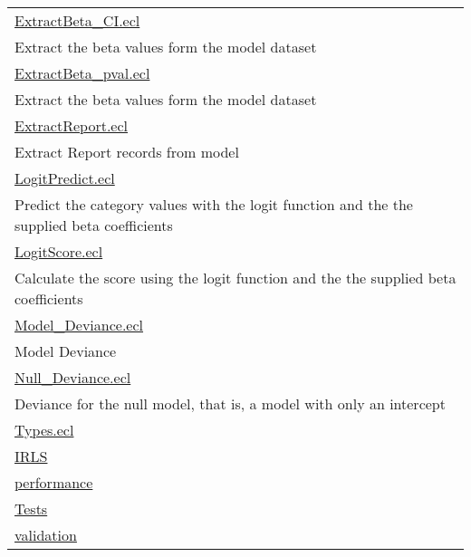 {\begin{longtable}{|p{\textwidth}|}
\hline
\hyperlink{ecldoc:toc:LogisticRegression.ExtractBeta_CI}{ExtractBeta\_CI.ecl} \\
Extract the beta values form the model dataset \\
\hline
\hyperlink{ecldoc:toc:LogisticRegression.ExtractBeta_pval}{ExtractBeta\_pval.ecl} \\
Extract the beta values form the model dataset \\
\hline
\hyperlink{ecldoc:toc:LogisticRegression.ExtractReport}{ExtractReport.ecl} \\
Extract Report records from model \\
\hline
\hyperlink{ecldoc:toc:LogisticRegression.LogitPredict}{LogitPredict.ecl} \\
Predict the category values with the logit function and the the supplied beta coefficients \\
\hline
\hyperlink{ecldoc:toc:LogisticRegression.LogitScore}{LogitScore.ecl} \\
Calculate the score using the logit function and the the supplied beta coefficients \\
\hline
\hyperlink{ecldoc:toc:LogisticRegression.Model_Deviance}{Model\_Deviance.ecl} \\
Model Deviance \\
\hline
\hyperlink{ecldoc:toc:LogisticRegression.Null_Deviance}{Null\_Deviance.ecl} \\
Deviance for the null model, that is, a model with only an intercept \\
\hline
\hyperlink{ecldoc:toc:LogisticRegression.Types}{Types.ecl} \\
\hline
\hyperlink{ecldoc:toc:root/LogisticRegression/IRLS}{IRLS} \\
\hline
\hyperlink{ecldoc:toc:root/LogisticRegression/performance}{performance} \\
\hline
\hyperlink{ecldoc:toc:root/LogisticRegression/Tests}{Tests} \\
\hline
\hyperlink{ecldoc:toc:root/LogisticRegression/validation}{validation} \\
\hline
\end{longtable}
}
























